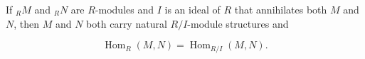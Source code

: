 If $_R M$ and $_R N$ are $R$-modules and $I$ is an ideal of $R$ that annihilates both $M$ and $N$, then $M$ and $N$ both carry natural $R/I$-module structures and

$$\operatorname{Hom}_R(M, N) = \operatorname{Hom}_{R/I}(M, N).$$
